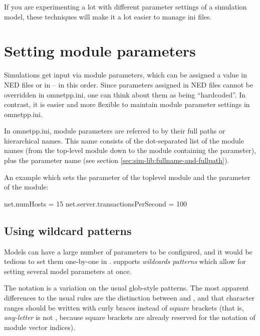 If you are experimenting a lot with different parameter settings of a
simulation model, these techniques will make it a lot easier to manage
ini files.

\section{Setting module parameters}
\label{sec:ch-config-sim:parameter-settings}

Simulations get input via module parameters, which can be assigned a
value in NED files or in  -- in this order. Since parameters
assigned in NED files cannot be overridden in omnetpp.ini, one can
think about them as being ``hardcoded''. In contrast, it is easier
and more flexible to maintain module parameter settings in omnetpp.ini.

In omnetpp.ini, module parameters are referred to by their full paths
or hierarchical names. This name consists of the dot-separated list of
the module names (from the top-level module down to the module containing
the parameter), plus the parameter name
(see section \ref{sec:sim-lib:fullname-and-fullpath}).

An example  which sets the  parameter of
the toplevel module and the  parameter of the
 module:

\begin{inifile}
[General]
net.numHosts = 15
net.server.transactionsPerSecond = 100
\end{inifile}


\subsection{Using wildcard patterns}
\label{sec:ch-config-sim:wildcards}

Models can have a large number of parameters to be configured, and it would
be tedious to set them one-by-one in . {\opp} supports
\textit{wildcards patterns} which allow for setting several model parameters
at once.

The notation is a variation on the usual glob-style patterns.
The most apparent differences to the usual rules are the distinction between
\ttt{*} and \ttt{**}, and that character ranges should be written
with curly braces instead of square brackets (that is, \textit{any-letter}
is  not \ttt{[a-zA-Z]}, because square brackets are
already reserved for the notation of module vector indices).

